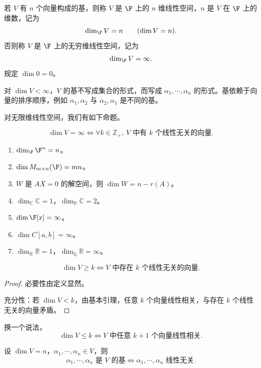 \begin{definition}\label{p1:concept:c4-l375}
	若 $V$ 有 $n$ 个向量构成的基，则称 $V$ 是 $\F$ 上的 $n$ 维线性空间，$n$ 是 $V$ 在 $\F$ 上的维数，记为
	\[
	\dim_{\F}V=n
	\qquad (\dim V=n).
	\]
	否则称 $V$ 是 $\F$ 上的无穷维线性空间，记为
	\[
	\dim_{\F}V=\infty.
	\]
	规定 $\dim 0=0$。
\end{definition}

对 $\dim V<\infty$，$V$ 的基不写成集合的形式，而写成 $\alpha_1,\cdots,\alpha_n$ 的形式。基依赖于向量的排序顺序，例如 $\alpha_1,\alpha_2$ 与 $\alpha_2,\alpha_1$ 是不同的基。

对无限维线性空间，我们有如下命题。
\begin{proposition}
	\[
	\dim V=\infty
	\Longleftrightarrow
	\forall k\in\mathbb{Z}_{+},\ V\text{ 中有 }k\text{ 个线性无关的向量}.
	\]
\end{proposition}

\begin{example}
	\begin{enumerate}
		\item $\dim_{\F}\F^n=n$。
		\item $\dim M_{m\times n}(\F)=mn$。
		\item $W$ 是 $AX=0$ 的解空间，则 $\dim W=n-r(A)$。
		\item $\dim_{\mathbb{C}}\mathbb{C}=1$，$\dim_{\mathbb{R}}\mathbb{C}=2$。
		\item $\dim \F[x]=\infty$。
		\item $\dim C[a,b]=\infty$。
		\item $\dim_{\mathbb{R}}\mathbb{R}=1$，$\dim_{\mathbb{Q}}\mathbb{R}=\infty$。
	\end{enumerate}
\end{example}

\begin{proposition}
	\[
	\dim V\geq k
	\Longleftrightarrow
	V\text{ 中存在 }k\text{ 个线性无关的向量}.
	\]
\end{proposition}

\begin{proof}
	必要性由定义显然。
	
	充分性：若 $\dim V<k$，由基本引理，任意 $k$ 个向量线性相关，与存在 $k$ 个线性无关的向量矛盾。
\end{proof}

换一个说法，
\[
\dim V\leq k
\Longleftrightarrow
V\text{ 中任意 }k+1\text{ 个向量线性相关}.
\]

\begin{corollary}
	设 $\dim V=n$，$\alpha_1,\cdots,\alpha_n\in V$，则
	\[
	\alpha_1,\cdots,\alpha_n\text{ 是 }V\text{ 的基}
	\Longleftrightarrow
	\alpha_1,\cdots,\alpha_n\text{ 线性无关}.
	\]
\end{corollary}

